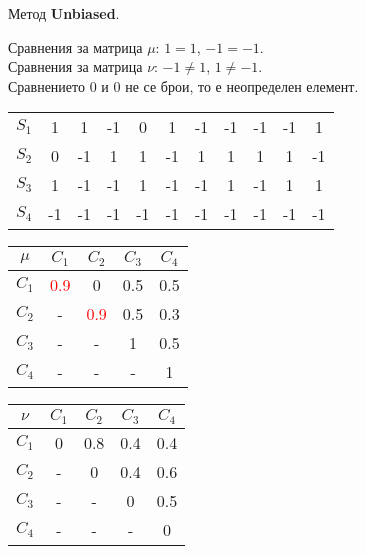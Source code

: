 \documentclass{beamer}
\begin{document}
\begin{frame}
Метод \textbf{Unbiased}.

\bigskip
Сравнения за матрица $\mu$: $1=1$, $-1=-1$.\\
Сравнения за матрица $\nu$: $-1\neq1$, $1\neq-1$.\\
Сравнението $0$ и $0$ не се брои, то е неопределен елемент.

\begin{center}
\begin{tabular}{c|cccccccccc}
& & & & & & & & & & \\
\hline $S_1$ & 1 & 1 & -1 & 0 & 1 & -1 & -1 & -1 & -1 & 1 \\
$S_2$ & 0 & -1 & 1 & 1 & -1 & 1 & 1 & 1 & 1 & -1 \\
$S_3$ & 1 & -1 & -1 & 1 & -1 & -1 & 1 & -1 & 1 & 1 \\
$S_4$ & -1 & -1 & -1 & -1 & -1 & -1 & -1 & -1 & -1 & -1
\end{tabular}
\end{center}

\begin{center}
\begin{minipage}[b]{0.4\linewidth}
\begin{tabular}{c|cccc}
$\mu$ & $C_1$ & $C_2$ & $C_3$ & $C_4$ \\
\hline $C_1$ & \textcolor{red}{0.9} & 0 & 0.5 & 0.5 \\
$C_2$ & - & \textcolor{red}{0.9} & 0.5 & 0.3 \\
$C_3$ & - & - & 1 & 0.5 \\
$C_4$ & - & - & - & 1
\end{tabular}
\end{minipage}
\begin{minipage}[b]{0.4\linewidth}
\begin{tabular}{c|cccc}
$\nu$ & $C_1$ & $C_2$ & $C_3$ & $C_4$ \\
\hline $C_1$ & 0 & 0.8 & 0.4 & 0.4 \\
$C_2$ & - & 0 & 0.4 & 0.6 \\
$C_3$ & - & - & 0 & 0.5 \\
$C_4$ & - & - & - & 0
\end{tabular}
\end{minipage}
\end{center}
\end{frame}
\end{document}
